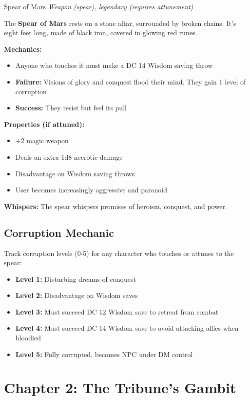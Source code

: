 \documentclass[letterpaper,oneside,twocolumn,openany]{dndbook}
\begin{document}
\begin{monsterbox}{Spear of Mars}
\textit{Weapon (spear), legendary (requires attunement)}

The \textbf{Spear of Mars} rests on a stone altar, surrounded by broken chains. It's eight feet long, made of black iron, covered in glowing red runes.

\textbf{Mechanics:}
\begin{itemize}
\item Anyone who touches it must make a DC 14 Wisdom saving throw
\item \textbf{Failure:} Visions of glory and conquest flood their mind. They gain 1 level of corruption
\item \textbf{Success:} They resist but feel its pull
\end{itemize}

\textbf{Properties (if attuned):}
\begin{itemize}
\item +2 magic weapon
\item Deals an extra 1d8 necrotic damage
\item Disadvantage on Wisdom saving throws
\item User becomes increasingly aggressive and paranoid
\end{itemize}

\textbf{Whispers:} The spear whispers promises of heroism, conquest, and power.
\end{monsterbox}

\section{Corruption Mechanic}

Track corruption levels (0-5) for any character who touches or attunes to the spear:
\begin{itemize}
\item \textbf{Level 1:} Disturbing dreams of conquest
\item \textbf{Level 2:} Disadvantage on Wisdom saves
\item \textbf{Level 3:} Must succeed DC 12 Wisdom save to retreat from combat
\item \textbf{Level 4:} Must succeed DC 14 Wisdom save to avoid attacking allies when bloodied
\item \textbf{Level 5:} Fully corrupted, becomes NPC under DM control
\end{itemize}

\chapter{Chapter 2: The Tribune's Gambit}
\end{document}
